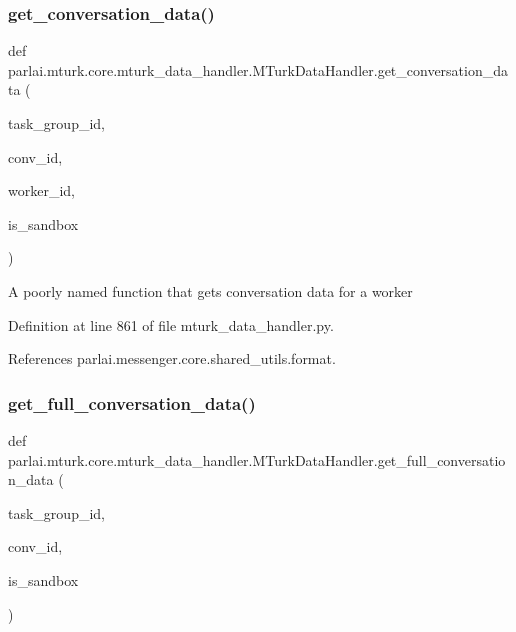 \subsubsection{\texorpdfstring{get\+\_\+conversation\+\_\+data()}{get\_conversation\_data()}}
{\footnotesize\ttfamily def parlai.\+mturk.\+core.\+mturk\+\_\+data\+\_\+handler.\+M\+Turk\+Data\+Handler.\+get\+\_\+conversation\+\_\+data (\begin{DoxyParamCaption}\item[{}]{task\+\_\+group\+\_\+id,  }\item[{}]{conv\+\_\+id,  }\item[{}]{worker\+\_\+id,  }\item[{}]{is\+\_\+sandbox }\end{DoxyParamCaption})\hspace{0.3cm}{\ttfamily [static]}}

\begin{DoxyVerb}A poorly named function that gets conversation data for a worker\end{DoxyVerb}
 

Definition at line 861 of file mturk\+\_\+data\+\_\+handler.\+py.



References parlai.\+messenger.\+core.\+shared\+\_\+utils.\+format.

\mbox{\label{classparlai_1_1mturk_1_1core_1_1mturk__data__handler_1_1MTurkDataHandler_aac3142a54b238e4d6b976ce657b5f7ac}} 
\subsubsection{\texorpdfstring{get\+\_\+full\+\_\+conversation\+\_\+data()}{get\_full\_conversation\_data()}}
{\footnotesize\ttfamily def parlai.\+mturk.\+core.\+mturk\+\_\+data\+\_\+handler.\+M\+Turk\+Data\+Handler.\+get\+\_\+full\+\_\+conversation\+\_\+data (\begin{DoxyParamCaption}\item[{}]{task\+\_\+group\+\_\+id,  }\item[{}]{conv\+\_\+id,  }\item[{}]{is\+\_\+sandbox }\end{DoxyParamCaption})\hspace{0.3cm}{\ttfamily [static]}}


